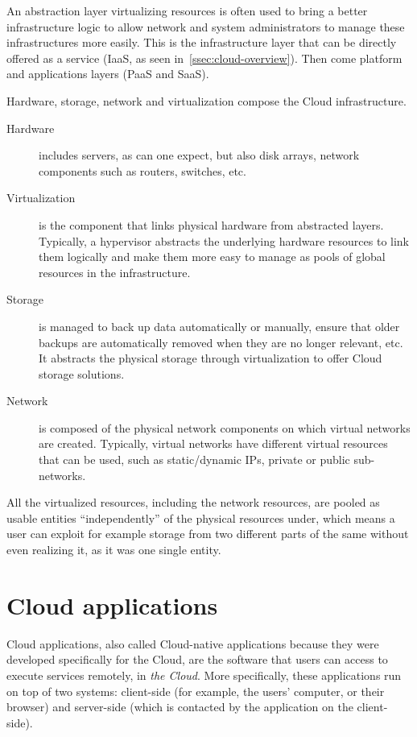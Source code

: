 An abstraction layer virtualizing resources is often used to bring a
better infrastructure logic to allow network and system administrators
to manage these infrastructures more easily. This is the
infrastructure layer that can be directly offered as a service (IaaS,
as seen in~\autoref{ssec:cloud-overview}). Then come platform and
applications layers (PaaS and SaaS).

Hardware, storage, network and virtualization compose the Cloud
infrastructure.
\begin{description}
\item[Hardware] includes \glspl{server}, as can one expect, but also
  \gls{disk array}s, network components such as \glspl{router},
  \gls{switch}es, etc.
\item[Virtualization] is the component that links physical hardware
  from abstracted layers. Typically, a \gls{hypervisor} abstracts the
  underlying hardware resources to link them logically and make them
  more easy to manage as pools of global resources in the
  infrastructure.
\item[Storage] is managed to back up data automatically or manually,
  ensure that older backups are automatically removed when they are no
  longer relevant, etc. It abstracts the physical storage through
  virtualization to offer Cloud storage solutions.
\item[Network] is composed of the physical network components on which
  virtual networks are created. Typically, virtual networks have
  different virtual resources that can be used, such as static/dynamic
  IPs, private or public sub-networks.
\end{description}

All the virtualized resources, including the network resources, are
pooled as usable entities ``independently'' of the physical resources
under, which means a user can exploit for example storage from two
different parts of the same \dc without even realizing it, as it was
one single entity.



\section{Cloud applications}
\label{sec:cloud-app}

Cloud applications, also called Cloud-native applications because they
were developed specifically for the Cloud, are the software that users
can access to execute services remotely, in \emph{the Cloud}.
%
More specifically, these applications run on top of two systems:
client-side (for example, the users' computer, or their browser) and
server-side (which is contacted by the application on the
client-side).


